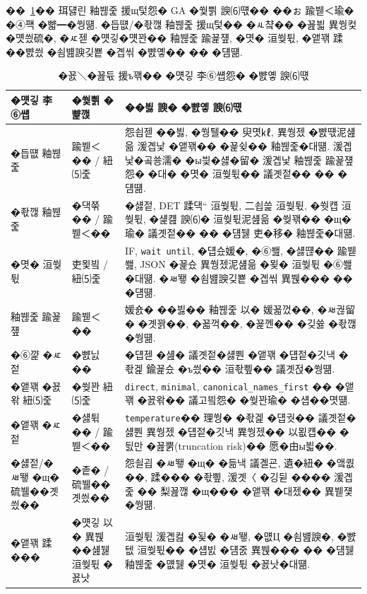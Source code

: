 \documentclass[10pt,twocolumn]{article}
\begin{document}
��~\ref{tab:prompt_search_dimensions}�� 珥덇린 釉붾줉 援щ텇怨� GA �쒗쁽 諛⑹떇�� ��ぉ 踰붿＜瑜� �④퍡 �뺣━�쒕떎. �듭떖/�좏깮 釉붾줉 援щ텇�� �ㅻ챸�� �꾪븳 異쒕컻�먯씠硫�, �ㅼ젣 �먯깋�먯꽌�� 釉붾줉 踰꾩쟾, �몃� 洹쒖튃, �앹꽦 蹂��뺤씠 �쇰뱶諛깆뿉 �곕씪 �뺤옣�� �� �덈떎.

\begin{table}[t]
\centering
\caption{�꾨＼�꾪듃 援ъ꽦�� �먯깋 李⑥썝怨� �뺤옣 諛⑹떇}
\label{tab:prompt_search_dimensions}
\footnotesize
\renewcommand{\arraystretch}{1.12}
\begin{tabularx}{\columnwidth}{@{}p{}p{}X@{}}
\toprule
\textbf{�먯깋 李⑥썝} & \textbf{�쒗쁽 �뺥깭} & \textbf{��븷 諛� �뺤옣 諛⑹떇} \\
\midrule
�듭떖 釉붾줉 & 踰붿＜�� / 紐⑸줉 & 怨쇱젣 ��븷, �쒕퉬�� 臾몃㎘, 異쒕젰 �뺤떇泥섎읆 湲곕낯 �앹꽦�� �꾩슂�� 釉붾줉�대떎. 湲곕낯�곸쑝濡� �ы븿�섏�留� 湲곕낯 釉붾줉 踰꾩쟾怨� �대� �몃� 洹쒖튃�� 議곗젙�� �� �덈떎. \\
�좏깮 釉붾줉 & �댁쭊�� / 踰붿＜�� & �섏젙, DET 蹂댁“ 洹쒖튃, 二쇱쓽 洹쒖튃, �쒓컙 洹쒖튃, �섍컖 諛⑹� 洹쒖튃泥섎읆 �쒖꽦�� �щ�瑜� 議곗젙�� �� �덈뒗 吏�移� 釉붾줉�대떎. \\
�몃� 洹쒖튃 & 吏묓빀 / 紐⑸줉 & IF, \texttt{wait until}, �덉슜媛�, �⑥쐞, �섏떊�� 踰붿쐞, JSON �꾩슜 異쒕젰泥섎읆 �묒� 洹쒖튃 �⑥쐞�대떎. �ㅽ뙣 �쇰뱶諛깆뿉 �곕씪 異붽��� �� �덈떎. \\
釉붾줉 踰꾩쟾 & 踰붿＜�� & 媛숈� ��븷�� 釉붾줉 以� 媛꾧껐��, �ㅽ궎留� �곗꽑��, �꾧꺽��, �꾩껜�� �깆쓣 �좏깮�쒕떎. \\
�⑥꺑 �ㅼ젙 & �뺤닔�� & �덉젣 �섎� 議곗젙�섏뿬 �앹꽦 �덉젙�깃낵 �좏겙 鍮꾩슜 �ъ씠�� 洹좏삎�� 議곗젅�쒕떎. \\
�앹꽦 �꾨왂 紐⑸줉 & �쒖꽌 紐⑸줉 & \texttt{direct}, \texttt{minimal}, \texttt{canonical\_names\_first} �� �앹꽦 �꾨왂�� 議고빀怨� �쒖꽌瑜� �섑��몃떎. \\
�앹꽦 �ㅼ젙 & �섏튂�� / 踰붿＜�� & \texttt{temperature}�� 理쒕� �좏겙 �덉궛�� 議곗젙�섏뿬 異쒕젰 �덉젙�깃낵 異쒕젰�� 以묎컙�� �딄만 �꾪뿕(truncation risk)�� 愿�由ы븳��. \\
�섏젙/�ㅽ뙣 �щ� 硫뷀��곗씠�� & �좉� / 硫뷀��곗씠�� & 怨쇨굅 �ㅽ뙣 �щ� �듦낵 議곌굔, 遺�紐� �앸퀎��, 蹂��� �좏삎, 湲곗〈 �깅뒫 ���� 湲곕줉 �� 梨꾪깮 �щ��� �앹꽦 �대젰�� 異붿쟻�쒕떎. \\
�앹꽦 蹂��� & �먯깋 以� 異붽��섎뒗 洹쒖튃 �꾨낫 & 洹쒖튃 湲곕컲 �됯� �ㅽ뙣, �먮Ц �쇰뱶諛�, �뺤텞 洹쒖튃�� �섑빐 �덈줈 異붽��� �� �덈뒗 釉붾줉 �먮뒗 �몃� 洹쒖튃 �꾨낫�대떎. \\
\bottomrule
\end{tabularx}
\end{table}
\end{document}
